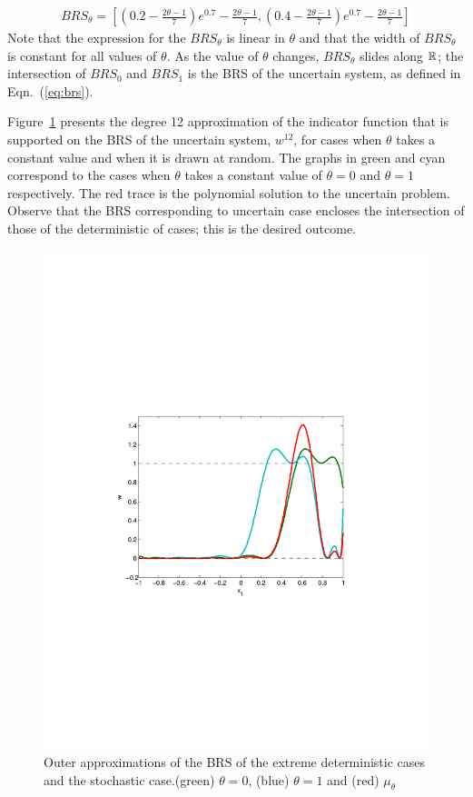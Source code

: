 \tiny
\begin{align*}
  BRS_\theta=\left[\left(0.2-\frac{2\theta-1}{7}\right)e^{0.7}-\frac{2\theta-1}{7}, \left(0.4-\frac{2\theta-1}{7}\right)e^{0.7}-\frac{2\theta-1}{7}\right]
\end{align*}
\normalsize
Note that the expression for the $BRS_\theta$ is linear in $\theta$ and that the width of $BRS_\theta$ is constant for all values of $\theta$. As the value of $\theta$ changes, $BRS_\theta$ slides along $\mathbb{R}$; the intersection of $BRS_0$ and $BRS_1$ is the BRS of the uncertain system, as defined in Eqn.~(\ref{eq:brs}).
\par
Figure~\ref{fig:1D:linear} presents the degree 12 approximation of the indicator function that is supported on the BRS of the uncertain system, $w^{12}$, for cases when $\theta$ takes a constant value and when it is drawn at random. The graphs in green and cyan correspond to the cases when $\theta$ takes a constant value of $\theta=0$ and $\theta=1$ respectively. The red trace is the polynomial solution to the uncertain problem. Observe that the BRS corresponding to uncertain case encloses the intersection of those of the deterministic of cases; this is the desired outcome.
\begin{figure}[!t]
  \includegraphics[width=\columnwidth,trim =1.5in 3.3in 1.5in 3.5in, clip=true]{figures/1D_3}
  \caption{Outer approximations of the BRS of the extreme deterministic cases and the stochastic case.(green) $\theta=0$, (blue) $\theta=1$ and (red) $\mu_\theta$}
    \label{fig:1D:linear}
\end{figure}
